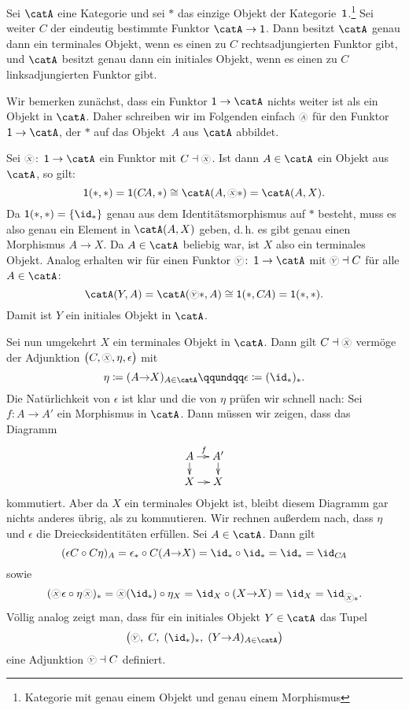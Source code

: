 \pagebreak[2]
\begin{thBeispiel}
    \label{ch1:bsp:initterm}
    Sei $\catA$ eine Kategorie und sei $\ast$ das einzige Objekt der
    Kategorie~$\operatorname{\mathsf{1}}$.\footnote{Kategorie mit genau einem Objekt und genau einem
    Morphismus} Sei weiter $C$ der eindeutig bestimmte Funktor $\catA\to\One$.
    Dann besitzt $\catA$ genau dann ein terminales Objekt, wenn es einen
    zu $C$ rechtsadjungierten Funktor gibt, und $\catA$ besitzt genau dann ein
    initiales Objekt, wenn es einen zu $C$ linksadjungierten Funktor gibt.

    \newcommand{\cA}{\circledchar[black!40]{$A$}}
    \newcommand{\cX}{\circledchar[black!40]{$X$}}
    \newcommand{\cY}{\circledchar[black!40]{$Y$}}
    Wir bemerken zunächst, dass ein Funktor $\One\to\catA$ nichts weiter ist
    als ein Objekt in $\catA$. Daher schreiben wir im Folgenden einfach
    $\cA$ für den Funktor $\One\to\catA$, der $\ast$ auf das Objekt~$A$ aus
    $\catA$ abbildet.
    
    Sei $\cX\colon\One\to\catA$ ein Funktor mit $C\leftadjoint\cX$. Ist dann
    $A\in\catA$ ein Objekt aus $\catA$, so gilt:
    \[ \One(\ast,\ast) = \One(C\!A,\ast) \cong \catA(A,\cX\ast) = \catA(A,X) . \]
    Da $\One(\ast,\ast) = \{\id_\ast\}$ genau aus dem Identitätsmorphismus auf
    $\ast$ besteht, muss es also genau ein Element in $\catA(A,X)$ geben, d.\,h.
    es gibt genau einen Morphismus $A\to X$. Da $A\in\catA$ beliebig war, ist
    $X$ also ein terminales Objekt. Analog erhalten wir für einen Funktor
    $\cY\colon\One\to\catA$ mit $\cY\leftadjoint C$ für alle $A\in\catA$:
    \[ \catA(Y,A) = \catA(\cY\ast,A) \cong \One(\ast,C\!A) = \One(\ast,\ast) . \]
    Damit ist $Y$ ein initiales Objekt in $\catA$.

    Sei nun umgekehrt $X$ ein terminales Objekt in $\catA$. Dann gilt
    $C\leftadjoint\cX$ vermöge der Adjunktion
    $\bigl(C,\cX, \eta, \epsilon\bigr)$ mit 
    \[ \eta \defeq (A{\to}X)_{A\in\catA} \qqundqq \epsilon \defeq (\id_\ast)_\ast
    . \]
    Die Natürlichkeit von $\epsilon$ ist klar und die von $\eta$ prüfen wir
    schnell nach: Sei $f\colon A\to A'$ ein Morphismus in $\catA$. Dann müssen
    wir zeigen, dass das Diagramm 
    \vspace{-2mm}
    \[
        \xymatrix@=3.5mm{A \ar[r]^f \ar[d] & A' \ar[d] \\ X \ar[r] & X}
    \]
    kommutiert. Aber da $X$ ein terminales Objekt ist, bleibt diesem Diagramm
    gar nichts anderes übrig, als zu kommutieren. Wir rechnen außerdem nach,
    dass $\eta$ und $\epsilon$ die Dreiecksidentitäten erfüllen. 
    Sei $A\in\catA$. Dann gilt
    \[ (\epsilon C \after C\eta)_A 
        = \epsilon_\ast \after C(A{\to}X)
        = \id_\ast \after \id_\ast
        = \id_\ast = \id_{C\!A}
    \]
    sowie
    \[ (\cX\mkern1mu\epsilon \after \eta\mkern1mu\cX)_\ast
        = \cX(\id_\ast) \after \eta_X
        = \id_X \after (X{\to}X)
        = \id_X = \id_{\cX\ast}
    . \]
    Völlig analog zeigt man, dass für ein initiales Objekt $Y\in\catA$ das Tupel
    \[ \bigl( \cY,\; C,\; (\id_\ast)_\ast,\; (Y{\to}A)_{A\in\catA} \bigr) \]
    eine Adjunktion $\cY\leftadjoint C$ definiert.
\end{thBeispiel}
